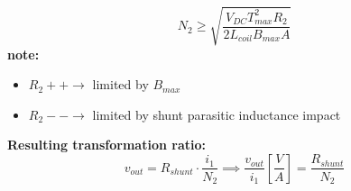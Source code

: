 \begin{equation}
    \boxed{N_2 \geq \sqrt{\frac{V_{DC} T_{max}^2 R_2}{2 L_{coil} B_{max}A}}}
    \label{eq:N2}
\end{equation}
\textbf{note:}
\begin{itemize}
    \item $R_2 ++ \rightarrow$ limited by $B_{max}$
    \item $R_2 -- \rightarrow$ limited by shunt parasitic inductance impact
\end{itemize}

\textbf{Resulting transformation ratio:}
\begin{equation}
    v_{out} = R_{shunt} \cdot \frac{i_1}{N_2} \implies \boxed{\frac{v_{out}}{i_1}\left[ \frac{V}{A} \right] = \frac{R_{shunt}}{N_2}}
    \label{eq:tr_ratio}
\end{equation}

